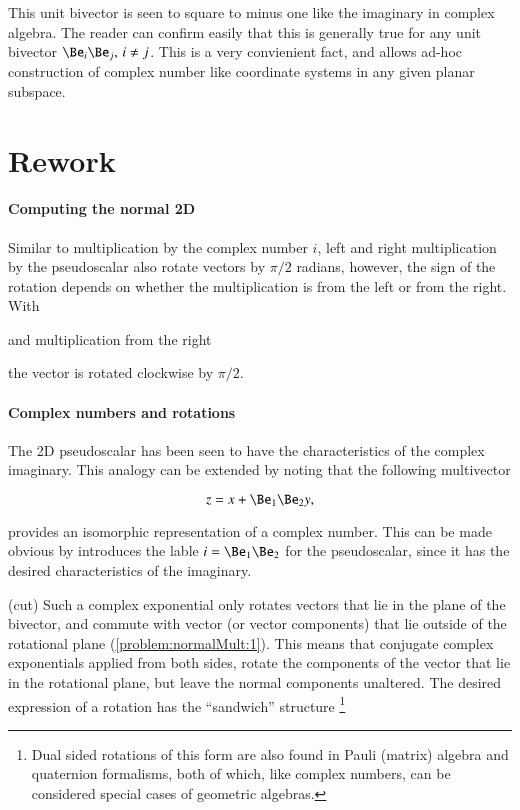 This unit bivector is seen to square to minus one like the imaginary in complex algebra.
The reader can confirm easily that this is generally true for any unit bivector \( \Be_i \Be_j, \, i \ne j \).
This is a very convienient fact, and allows ad-hoc construction of complex number like coordinate systems in any given planar subspace.

\section{Rework}
\paragraph{Computing the normal 2D}

Similar to multiplication by the complex number \( i \),
left and right multiplication by the pseudoscalar also rotate vectors by \( \pi/2 \) radians, however, the sign of the rotation depends on whether the multiplication is from the left or from the right.
With

and multiplication from the right

the vector is rotated clockwise by \( \pi/2 \).
%
\paragraph{Complex numbers and rotations}

The 2D pseudoscalar has been seen to have the characteristics of the complex imaginary.
This analogy can be extended by noting that the following multivector

\begin{dmath}\label{eqn:SimpleProducts2:320}
z = x + \Be_1 \Be_2 y,
\end{dmath}

provides an isomorphic representation of a complex number.
This can be made obvious by introduces the lable \( i = \Be_1 \Be_2 \) for the pseudoscalar, since it has the desired characteristics of the imaginary.

(cut)
Such a complex exponential only rotates vectors that lie in the plane of the bivector, and commute with vector (or vector components) that lie outside of the rotational plane (\cref{problem:normalMult:1}).
This means that conjugate complex exponentials applied from both sides,
rotate the components of the vector that lie in the rotational plane, but leave the normal components unaltered.
The desired expression of a  rotation
has the ``sandwich'' structure
\footnote{Dual sided rotations of this form are also found in Pauli (matrix) algebra and quaternion formalisms, both of which, like complex numbers, can be considered special cases of geometric algebras.}

